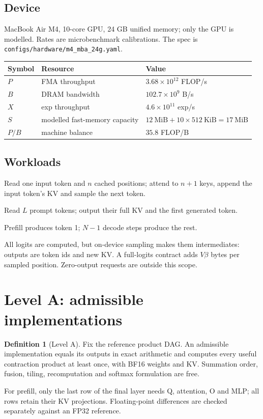 \documentclass[11pt]{article}
\theoremstyle{definition}
\newtheorem{definition}{Definition}
\theoremstyle{remark}
\begin{document}
\begin{samepage}
\subsection{Device}
MacBook Air M4, 10-core GPU, 24 GB unified memory; only the GPU is modelled.
Rates are microbenchmark calibrations. The spec is \texttt{configs/hardware/m4\_mba\_24g.yaml}.
\begin{center}
\begin{tabular}{lll}
\toprule
Symbol & Resource & Value \\
\midrule
$P$ & FMA throughput & $3.68\times10^{12}$ FLOP/s \\
$B$ & DRAM bandwidth & $102.7\times10^{9}$ B/s \\
$X$ & exp throughput & $4.6\times10^{11}$ exp/s \\
$S$ & modelled fast-memory capacity & $12\ \text{MiB}+10\times512\ \text{KiB}=17\ \text{MiB}$ \\
$P/B$ & machine balance & $35.8$ FLOP/B \\
\bottomrule
\end{tabular}
\end{center}

\end{samepage}

\subsection{Workloads}
\begin{description}[nosep,leftmargin=1.5em]
\item[Decode $(n)$.] Read one input token and $n$ cached positions; attend to $n+1$ keys,
append the input token's KV and sample the next token.
\item[Prefill $(L\ge1)$.] Read $L$ prompt tokens; output their full KV and the first generated token.
\item[Request $(L,N\ge1)$.] Prefill produces token 1; $N-1$ decode steps produce the rest.
\end{description}
All logits are computed, but on-device sampling makes them intermediates: outputs are token ids and
new KV. A full-logits contract adds $V\beta$ bytes per sampled position. Zero-output requests are outside this scope.

\section{Level A: admissible implementations}\label{sec:levelA}
\begin{definition}[Level A]
Fix the reference product DAG. An admissible implementation equals its outputs in exact arithmetic
and computes every useful contraction product at least once, with BF16 weights and KV. Summation
order, fusion, tiling, recomputation and softmax formulation are free.
\end{definition}
For prefill, only the last row of the final layer needs Q, attention, O and MLP; all rows retain their
KV projections. Floating-point differences are checked separately against an FP32 reference.
\end{document}
